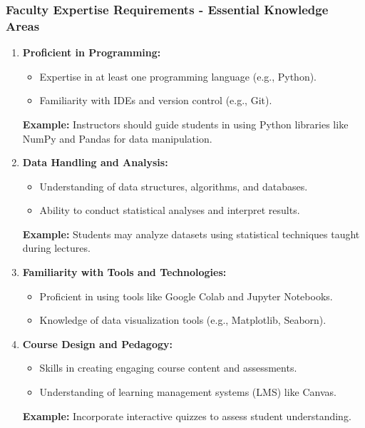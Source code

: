 \documentclass[aspectratio=169]{beamer}
\begin{document}
\begin{frame}[fragile]
    \frametitle{Faculty Expertise Requirements - Essential Knowledge Areas}
    \begin{enumerate}
        \item \textbf{Proficient in Programming:}
            \begin{itemize}
                \item Expertise in at least one programming language (e.g., Python).
                \item Familiarity with IDEs and version control (e.g., Git).
            \end{itemize}
            \textbf{Example:} Instructors should guide students in using Python libraries like NumPy and Pandas for data manipulation.

        \item \textbf{Data Handling and Analysis:}
            \begin{itemize}
                \item Understanding of data structures, algorithms, and databases.
                \item Ability to conduct statistical analyses and interpret results.
            \end{itemize}
            \textbf{Example:} Students may analyze datasets using statistical techniques taught during lectures.

        \item \textbf{Familiarity with Tools and Technologies:}
            \begin{itemize}
                \item Proficient in using tools like Google Colab and Jupyter Notebooks.
                \item Knowledge of data visualization tools (e.g., Matplotlib, Seaborn).
            \end{itemize}

        \item \textbf{Course Design and Pedagogy:}
            \begin{itemize}
                \item Skills in creating engaging course content and assessments.
                \item Understanding of learning management systems (LMS) like Canvas.
            \end{itemize}
            \textbf{Example:} Incorporate interactive quizzes to assess student understanding.
    \end{enumerate}
\end{frame}
\end{document}

